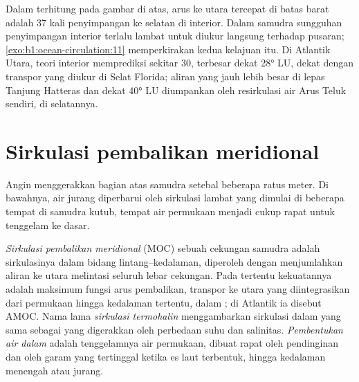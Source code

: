 Dalam  terhitung pada gambar di atas, arus ke utara tercepat di batas barat adalah 37 kali penyimpangan ke selatan di interior. Dalam samudra sungguhan penyimpangan interior terlalu lambat untuk diukur langsung terhadap pusaran; \cref{exo:b1:ocean-circulation:11} memperkirakan kedua kelajuan itu. Di Atlantik Utara, teori interior memprediksi  sekitar \qty{30}{\sverdrup}, terbesar dekat \ang{28} LU, dekat dengan transpor yang diukur di Selat Florida; aliran yang jauh lebih besar di lepas Tanjung Hatteras dan dekat \ang{40} LU diumpankan oleh resirkulasi air Arus Teluk sendiri, di selatannya.

\section{Sirkulasi pembalikan meridional}\label{sec:b1:ocean-circulation:moc}

Angin menggerakkan bagian atas samudra setebal beberapa ratus meter. Di bawahnya, air jurang diperbarui oleh sirkulasi lambat yang dimulai di beberapa tempat di samudra kutub, tempat air permukaan menjadi cukup rapat untuk tenggelam ke dasar.

\begin{definition}\label{def:b1:ocean-circulation:moc}
\emph{Sirkulasi pembalikan meridional} (MOC) sebuah cekungan samudra adalah sirkulasinya dalam bidang lintang--kedalaman, diperoleh dengan menjumlahkan aliran ke utara melintasi seluruh lebar cekungan. Pada  tertentu kekuatannya adalah maksimum fungsi arus pembalikan, transpor ke utara yang diintegrasikan dari permukaan hingga kedalaman tertentu, dalam ; di Atlantik ia disebut AMOC. Nama lama \emph{sirkulasi termohalin} menggambarkan sirkulasi dalam yang sama sebagai yang digerakkan oleh perbedaan suhu dan salinitas. \emph{Pembentukan air dalam} adalah tenggelamnya air permukaan, dibuat rapat oleh pendinginan dan oleh garam yang tertinggal ketika es laut terbentuk, hingga kedalaman menengah atau jurang.
\end{definition}

